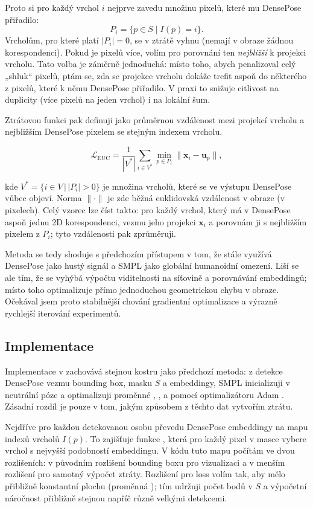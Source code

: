 \documentclass[11pt,a4paper,twoside,openright]{report}
\begin{document}
Proto si pro každý vrchol $i$ nejprve zavedu množinu pixelů, které mu DensePose přiřadilo:
\[
P_i = \{p \in S\;|\; I(p)=i\}.
\]
Vrcholům, pro které platí $|P_i|=0$, se v ztrátě vyhnu (nemají v obraze žádnou korespondenci). Pokud je pixelů více, volím pro porovnání ten \emph{nejbližší} k projekci vrcholu. Tato volba je záměrně jednoduchá: místo toho, abych penalizoval celý „shluk“ pixelů, ptám se, zda se projekce vrcholu dokáže trefit aspoň do některého z pixelů, které k němu DensePose přiřadilo. V praxi to snižuje citlivost na duplicity (více pixelů na jeden vrchol) i na lokální šum.

Ztrátovou funkci pak definuji jako průměrnou vzdálenost mezi projekcí vrcholu a nejbližším DensePose pixelem se stejným indexem vrcholu.

\[
\mathcal{L}_{\text{EUC}} = \frac{1}{|V^{*}|} \sum_{i \in V^{*}} \min_{p \in P_i} \lVert \mathbf{x}_i - \mathbf{u}_p \rVert,
\]

kde $V^{*} = \{ i \in V\,|\, |P_i|>0 \}$ je množina vrcholů, které se ve výstupu DensePose vůbec objeví. Norma $\lVert \cdot \rVert$ je zde běžná euklidovská vzdálenost v obraze (v pixelech). Celý vzorec lze číst takto: pro každý vrchol, který má v DensePose aspoň jednu 2D korespondenci, vezmu jeho projekci $\mathbf{x}_i$ a porovnám ji s nejbližším pixelem z $P_i$; tyto vzdálenosti pak zprůměruji.

Metoda se tedy shoduje s předchozím přístupem v tom, že stále využívá DensePose jako hustý signál a SMPL jako globální humanoidní omezení. Liší se ale tím, že se vyhýbá výpočtu viditelnosti na síťovině a porovnávání embeddingů; místo toho optimalizuje přímo jednoduchou geometrickou chybu v obraze. Očekával jsem proto stabilnější chování gradientní optimalizace a výrazně rychlejší iterování experimentů.

\subsection{Implementace}

Implementace v  zachovává stejnou kostru jako předchozí metoda: z detekce DensePose vezmu bounding box, masku $S$ a embeddingy, SMPL inicializuji v neutrální póze a optimalizuji proměnné , ,  a  pomocí optimalizátoru Adam \cite{kingma2015adam}. Zásadní rozdíl je pouze v tom, jakým způsobem z těchto dat vytvořím ztrátu.

Nejdříve pro každou detekovanou osobu převedu DensePose embeddingy na mapu indexů vrcholů $I(p)$. To zajišťuje funkce , která pro každý pixel v masce vybere vrchol s nejvyšší podobností embeddingu. V kódu tuto mapu počítám ve dvou rozlišeních: v původním rozlišení bounding boxu pro vizualizaci a v menším rozlišení pro samotný výpočet ztráty. Rozlišení pro loss volím tak, aby mělo přibližně konstantní plochu (proměnná ); tím udržuji počet bodů v $S$ a výpočetní náročnost přibližně stejnou napříč různě velkými detekcemi.
\end{document}

